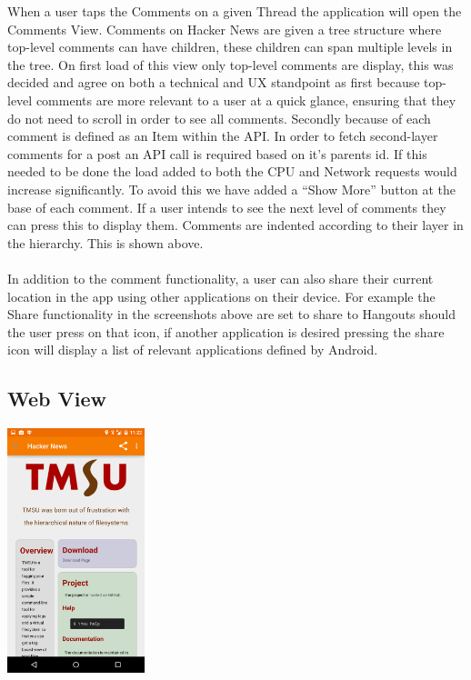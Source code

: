 \documentclass[11pt]{article}
\begin{document}
When a user taps the Comments on a given Thread the application will open the Comments View. Comments on Hacker News are given a tree structure where top-level comments can have children, these children can span multiple levels in the tree. On first load of this view only top-level comments are display, this was decided and agree on both a technical and UX standpoint as first because top-level comments are more relevant to a user at a quick glance, ensuring that they do not need to scroll in order to see all comments. Secondly because of each comment is defined as an Item within the API. In order to fetch second-layer comments for a post an API call is required based on it's parents id. If this needed to be done the load added to both the CPU and Network requests would increase significantly. To avoid this we have added a “Show More” button at the base of each comment. If a user intends to see the next level of comments they can press this to display them. Comments are indented according to their layer in the hierarchy. This is shown above.
\\
\\
In addition to the comment functionality, a user can also share their current location in the app using other applications on their device. For example the Share functionality in the screenshots above are set to share to Hangouts should the user press on that icon, if another application is desired pressing the share icon will display a list of relevant applications defined by Android. 

\subsection*{Web View}

\begin{center}
\includegraphics[width=0.3\textwidth]{webView.png}
\end{center}
\end{document}
